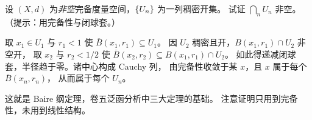 \begin{exercise}[延伸]
  \label{exr:baire-preview}
  设 \((X,d)\) 为\emph{非空}完备度量空间，\(\{U_{n}\}\) 为一列稠密开集。
  试证 \(\bigcap_{n} U_{n}\) 非空。（提示：用完备性与闭球套。）
  \begin{solution}
    取 \(x_{1} \in U_{1}\) 与 \(r_{1}<1\) 使 \(\overline{B}(x_{1},r_{1}) \subseteq U_{1}\)。
    因 \(U_{2}\) 稠密且开，\(B(x_{1},r_{1}) \cap U_{2}\) 非空开，
    取 \(x_{2}\) 与 \(r_{2}<1/2\) 使 \(\overline{B}(x_{2},r_{2}) \subseteq B(x_{1},r_{1}) \cap U_{2}\)。
    如此得递减闭球套，半径趋于零。诸中心构成 Cauchy 列，
    由完备性收敛于某 \(x\)，且 \(x\) 属于每个 \(\overline{B}(x_{n},r_{n})\)，
    从而属于每个 \(U_{n}\)。

    这就是 Baire 纲定理，卷五泛函分析中三大定理的基础。
    注意证明只用到完备性，未用到线性结构。
  \end{solution}
\end{exercise}

